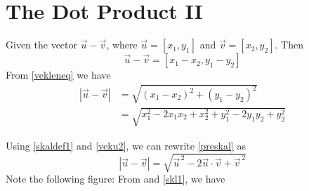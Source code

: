 \section{The Dot Product II}
Given the vector $ \vec{u}-\vec{v} $, where 
$ \vec{u}=[x_1, y_1] $ and $ \vec{v}=[x_2, y_2] $. Then
\[ \vec{u}-\vec{v}=[x_1-x_2, y_1-y_2] \]
From \eqref{vekleneq} we have
\begin{align}
	|\vec{u}-\vec{v}|&= \sqrt{(x_1-x_2)^2 + (y_1-y_2)^2} \nonumber \\
	&= \sqrt{x_1^2 - 2x_1 x_2 + x_2^2 + y_1^2 - 2y_1 y_2 + y_2^2 }\label{preskal}
\end{align}

Using \eqref{skaldef1} and \eqref{veku2}, we can rewrite \eqref{preskal} as
\begin{equation}
	|\vec{u}-\vec{v}|= \sqrt{\vec{u}^{\,2} - 2\vec{u}\cdot\vec{v} + \vec{v}^{\,2}} \label{skl1}
\end{equation}
Note the following figure:
From  and \eqref{skl1}, we have

